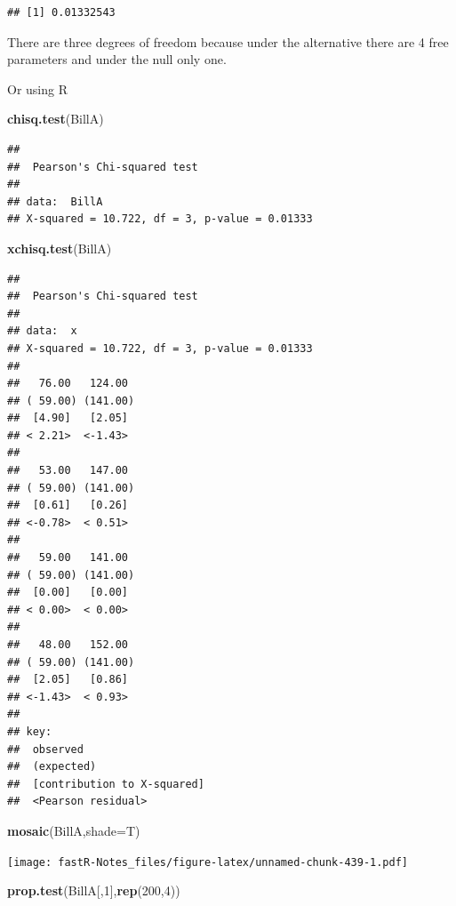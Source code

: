 \documentclass[]{book}
\newenvironment{Shaded}{\begin{snugshade}}{\end{snugshade}}
\newcommand{\KeywordTok}[1]{\textcolor[rgb]{0.13,0.29,0.53}{\textbf{#1}}}
\newcommand{\DataTypeTok}[1]{\textcolor[rgb]{0.13,0.29,0.53}{#1}}
\newcommand{\DecValTok}[1]{\textcolor[rgb]{0.00,0.00,0.81}{#1}}
\newcommand{\NormalTok}[1]{#1}
\theoremstyle{definition}
\theoremstyle{definition}
\theoremstyle{definition}
\theoremstyle{remark}
\begin{document}
\begin{verbatim}
## [1] 0.01332543
\end{verbatim}

There are three degrees of freedom because under the alternative there
are 4 free parameters and under the null only one.

Or using R

\begin{Shaded}
\begin{Highlighting}[]
\KeywordTok{chisq.test}\NormalTok{(BillA)}
\end{Highlighting}
\end{Shaded}

\begin{verbatim}
## 
##  Pearson's Chi-squared test
## 
## data:  BillA
## X-squared = 10.722, df = 3, p-value = 0.01333
\end{verbatim}

\begin{Shaded}
\begin{Highlighting}[]
\KeywordTok{xchisq.test}\NormalTok{(BillA)}
\end{Highlighting}
\end{Shaded}

\begin{verbatim}
## 
##  Pearson's Chi-squared test
## 
## data:  x
## X-squared = 10.722, df = 3, p-value = 0.01333
## 
##   76.00   124.00 
## ( 59.00) (141.00)
##  [4.90]   [2.05] 
## < 2.21>  <-1.43> 
##    
##   53.00   147.00 
## ( 59.00) (141.00)
##  [0.61]   [0.26] 
## <-0.78>  < 0.51> 
##    
##   59.00   141.00 
## ( 59.00) (141.00)
##  [0.00]   [0.00] 
## < 0.00>  < 0.00> 
##    
##   48.00   152.00 
## ( 59.00) (141.00)
##  [2.05]   [0.86] 
## <-1.43>  < 0.93> 
##    
## key:
##  observed
##  (expected)
##  [contribution to X-squared]
##  <Pearson residual>
\end{verbatim}

\begin{Shaded}
\begin{Highlighting}[]
\KeywordTok{mosaic}\NormalTok{(BillA,}\DataTypeTok{shade=}\NormalTok{T)}
\end{Highlighting}
\end{Shaded}

\texttt{[image: fastR-Notes\_files/figure-latex/unnamed-chunk-439-1.pdf]}

\begin{Shaded}
\begin{Highlighting}[]
\KeywordTok{prop.test}\NormalTok{(BillA[,}\DecValTok{1}\NormalTok{],}\KeywordTok{rep}\NormalTok{(}\DecValTok{200}\NormalTok{,}\DecValTok{4}\NormalTok{))}
\end{Highlighting}
\end{Shaded}
\end{document}
